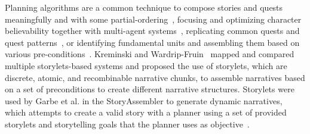 Planning algorithms are a common technique to compose stories and quests meaningfully and with some partial-ordering~, focusing and optimizing character believability together with multi-agent systems~, replicating common quests and quest patterns~, or identifying fundamental units and assembling them based on various pre-conditions~. Kreminski and Wardrip-Fruin~ mapped and compared multiple storylets-based systems and proposed the use of storylets, which are discrete, atomic, and recombinable narrative chunks, to assemble narratives based on a set of preconditions to create different narrative structures. Storylets were used by Garbe et al. in the StoryAssembler to generate dynamic narratives, which attempts to create a valid story with a planner using a set of provided storylets and storytelling goals that the planner uses as objective~. 










